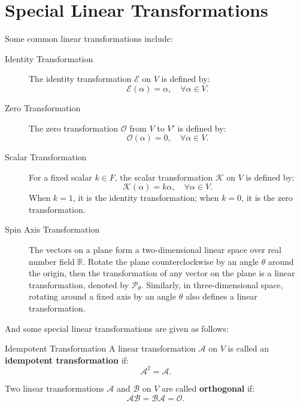 \documentclass[11pt]{../../TexTemplate/elegantbook} %
\begin{document}
\section{Special Linear Transformations}
Some common linear transformations include:
\begin{description}
    \item[Identity Transformation] The identity transformation \( \mathcal{E} \) on \( V \) is defined by:
        \[
        \mathcal{E}(\alpha) = \alpha, \quad \forall \alpha \in V.
        \]

    \item[Zero Transformation] The zero transformation \( \mathcal{O} \) from \( V \) to \( V' \) is defined by:
    \[
    \mathcal{O}(\alpha) = 0, \quad \forall \alpha \in V.
    \]

    \item[Scalar Transformation] For a fixed scalar \( k \in F \), 
        the scalar transformation \( \mathcal{K} \) on \( V \) is defined by:
        \[
        \mathcal{K}(\alpha) = k\alpha, \quad \forall \alpha \in V.
        \]
        When \( k = 1 \), it is the identity transformation; 
        when \( k = 0 \), it is the zero transformation. 

    \item[Spin Axis Transformation] 
        The vectors on a plane form a two-dimensional linear space over real number field \( \mathbb{R} \).
        Rotate the plane counterclockwise by an angle \( \theta \) around the origin, 
        then the transformation of any vector on the plane is a linear transformation,
        denoted by \( \mathcal{P}_{\theta}\).
        Similarly, in three-dimensional space, rotating around a fixed axis by an angle \( \theta \) 
        also defines a linear transformation.
\end{description}

\vspace{0.7cm}
And some special linear transformations are given as follows:
\begin{definition}{Idempotent Transformation}
    A linear transformation \( \mathcal{A} \) on \( V \) is called an \textbf{idempotent transformation} if:
    \[
    \mathcal{A}^2 = \mathcal{A}.
    \]
\end{definition}

Two linear transformations \( \mathcal{A} \) and \( \mathcal{B} \) on \( V \) are called \textbf{orthogonal} if:
\[
\mathcal{A} \mathcal{B} = \mathcal{B} \mathcal{A} = \mathcal{O}.
\]
\end{document}
